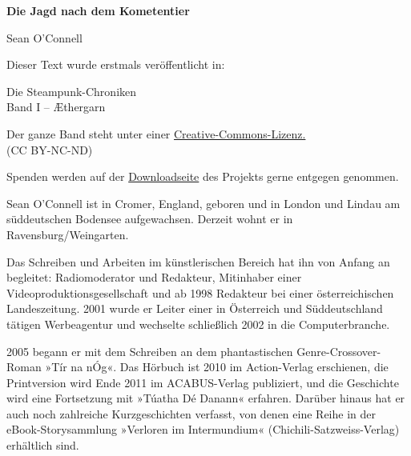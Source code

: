 \usepackage[ngerman]{babel}
\usepackage[T1]{fontenc}



\newcommand\bigpar\medskip


\raggedbottom
\begin{center}
\textbf{\huge\textsf{Die Jagd nach dem Kometentier}}

\bigskip
Sean O'Connell

\end{center}

\bigskip

\begin{flushleft}
Dieser Text wurde erstmals veröffentlicht in:
\begin{center}
Die Steampunk-Chroniken\\
Band I -- Æthergarn
\end{center}

\bigskip

Der ganze Band steht unter einer
\href{http://creativecommons.org/licenses/by-nc-nd/2.0/de/}{Creative-Commons-Lizenz.} \\
(CC BY-NC-ND)

\bigskip

Spenden werden auf der
\href{http://steampunk-chroniken.de/download}{Downloadseite}
des Projekts gerne entgegen genommen.
\end{flushleft}
\vfill


Sean O'Connell ist in Cromer, England, geboren und in London und
Lindau am süddeutschen Bodensee aufgewachsen. Derzeit wohnt er in
Ravensburg/Weingarten.

Das Schreiben und Arbeiten im künstlerischen Bereich hat ihn von
Anfang an begleitet: Radiomoderator und Redakteur, Mitinhaber einer
Videoproduktionsgesellschaft und ab 1998 Redakteur bei einer
österreichischen Landeszeitung. 2001 wurde er Leiter einer in
Österreich und Süddeutschland tätigen Werbeagentur und wechselte
schließlich 2002 in die Computerbranche.

2005 begann er mit dem Schreiben an dem phantastischen
Genre-Crossover-Roman »Tír na nÓg«. Das Hörbuch ist 2010 im
Action-Verlag erschienen, die Printversion wird Ende 2011 im
ACABUS-Verlag publiziert, und die Geschichte wird eine Fortsetzung
mit »Túatha Dé Danann« erfahren. Darüber hinaus hat er auch noch
zahlreiche Kurzgeschichten verfasst, von denen eine Reihe in der
eBook-Storysammlung »Verloren im Intermundium«
(Chichili-Satzweiss-Verlag) erhältlich sind.

